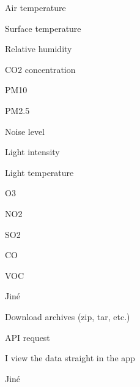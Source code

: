 \begin{choices}
\item Air temperature
\item Surface temperature
\item Relative humidity
\item CO2 concentration
\item PM10
\item PM2.5
\item Noise level
\item Light intensity
\item Light temperature
\item O3
\item NO2
\item SO2
\item CO
\item VOC
\item Jiné
\end{choices}

\begin{choices}
\item Download archives (zip, tar, etc.)
\item API request
\item I view the data straight in the app
\item Jiné
\end{choices}

